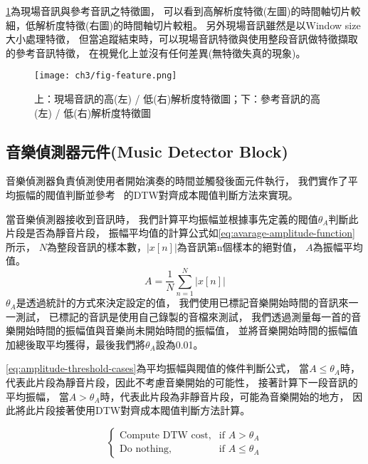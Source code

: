 \documentclass[class=NCU_thesis, crop=false]{standalone}
\begin{document}
\cref{fig:fig-ch3-feature}為現場音訊與參考音訊之特徵圖，
可以看到高解析度特徵(左圖)的時間軸切片較細，低解析度特徵(右圖)的時間軸切片較粗。
另外現場音訊雖然是以Window size大小處理特徵，
但當追蹤結束時，可以現場音訊特徵與使用整段音訊做特徵擷取的參考音訊特徵，
在視覺化上並沒有任何差異(無特徵失真的現象)。

\begin{figure}[H]
    \centering
    \texttt{[image: ch3/fig-feature.png]}
    \caption{上：現場音訊的高(左) / 低(右)解析度特徵圖；下：參考音訊的高(左) / 低(右)解析度特徵圖}
    \label{fig:fig-ch3-feature}
\end{figure}

\subsection{音樂偵測器元件(Music Detector Block)} \label{ch3-subst-music-detector}
音樂偵測器負責偵測使用者開始演奏的時間並觸發後面元件執行，
我們實作了平均振幅的閥值判斷並參考~\cite{Lin2020AHumanComputerDuetSystem}
的DTW對齊成本閥值判斷方法來實現。

當音樂偵測器接收到音訊時，
我們計算平均振幅並根據事先定義的閥值$\theta _{A}$判斷此片段是否為靜音片段，
振幅平均值的計算公式如\cref{eq:avarage-amplitude-function}所示，
$N$為整段音訊的樣本數，$| x[n] \vert$為音訊第n個樣本的絕對值，
$A$為振幅平均值。
\begin{equation}
    \label{eq:avarage-amplitude-function}
    A = \frac{1}{N} \sum _{n=1}^{N} | x[n] \vert 
\end{equation}
$\theta _{A}$是透過統計的方式來決定設定的值，
我們使用已標記音樂開始時間的音訊來一一測試，
已標記的音訊是使用自己錄製的音檔來測試，
我們透過測量每一首的音樂開始時間的振幅值與音樂尚未開始時間的振幅值，
並將音樂開始時間的振幅值加總後取平均獲得，最後我們將$\theta _{A}$設為0.01。

\cref{eq:amplitude-threshold-cases}為平均振幅與閥值的條件判斷公式，
當$A \leq \theta _{A}$時，代表此片段為靜音片段，因此不考慮音樂開始的可能性，
接著計算下一段音訊的平均振幅，
當$A > \theta _{A}$時，代表此片段為非靜音片段，可能為音樂開始的地方，
因此將此片段接著使用DTW對齊成本閥值判斷方法計算。

\begin{equation} 
    \label{eq:amplitude-threshold-cases}
    \begin{cases}
        \text{Compute DTW cost}, & \text{if $A > \theta _{A}$} \\
        \text{Do nothing},  & \text{if $A \leq \theta _{A}$}
    \end{cases}
\end{equation}
\end{document}
